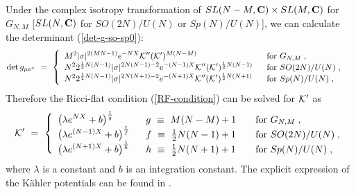 \documentclass[a4paper,11pt]{article}
\newcommand{\half}{\frac{1}{2}}
\newcommand{\ls}{\ \ \ \ \ }
\newcommand{\dps}{\displaystyle}
\newcommand{\kahler}{K\"{a}hler }
\begin{document}
{Under the complex isotropy transformation of $SL(N-M, {\bf C}) \times
SL(M, {\bf C})$ for $G_{N,M}$ [$SL(N, {\bf C})$ for $SO(2N)/U(N)$ or
$Sp(N)/U(N)$], 
we can calculate the determinant (\ref{det-g-so-sp0}): 
\begin{align}
\det g_{\mu \nu^*} \ &= \ \left\{
\begin{array}{l@{\ls}l}
\dps M^2 |\sigma|^{2(MN-1)} 
e^{-NX} {\cal K}'' ({\cal K}')^{M(N-M)} 
& \mbox{for $G_{N,M}$} \; , \\
\dps N^2 2^{\half N(N-1)} |\sigma|^{2N(N-1)-2} 
e^{-(N-1)X} {\cal K}'' ({\cal K}')^{\half N(N-1)} 
& \mbox{for $SO(2N)/U(N)$} \; , \\
\dps N^2 2^{\half N(N-1)} |\sigma|^{2N(N+1)-2} 
e^{-(N+1)X} {\cal K}'' ({\cal K}')^{\half N(N+1)} 
& \mbox{for $Sp(N)/U(N)$} \; , 
\end{array} \right. 
\end{align}
Therefore the Ricci-flat condition (\ref{RF-condition}) can be
solved for ${\cal K}'$ as
\begin{align}
{\cal K}' \ = \ \left\{
\begin{array}{l@{\ls}l@{\ls}l}
\dps \big( \lambda e^{N X} + b \big)^{\frac{1}{g}}
& g \ \equiv \ M(N-M) +1 & \mbox{ for $G_{N,M}$} \; ,\\
\dps \big( \lambda e^{(N-1) X} + b \big)^{\frac{1}{f}}
& f \ \equiv \ \half N (N-1) + 1 & \mbox{ for $SO(2N)/U(N)$} \; , \\
\dps \big( \lambda e^{(N+1) X} + b \big)^{\frac{1}{h}}
& h \ \equiv \ \half N (N+1) + 1 & \mbox{ for $Sp(N)/U(N)$} \; , 
\end{array} \right. \label{rf-sol-g}
\end{align}
where $\lambda$ is a constant and $b$ is an integration constant.
The explicit expression of the 
\kahler potentials can be found in \cite{HKN3}.

}
\end{document}
